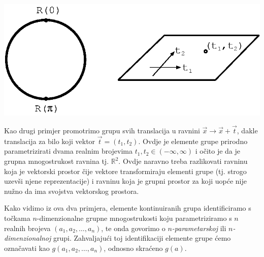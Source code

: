 \centerline{\includegraphics[scale=1.0]{pics/mnogostrukost.eps}}

Kao drugi primjer promotrimo grupu svih translacija u ravnini $\vec{x}\to\vec{x}+\vec{t}$,
dakle translacija za bilo koji vektor $\vec{t}=(t_1, t_2)$.
Ovdje je elemente grupe prirodno parametrizirati dvama
realnim brojevima $t_1, t_2 \in (-\infty, \infty)$ i očito je da je
 grupna mnogostrukost ravnina tj. $\mathbb{R}^2$. Ovdje naravno treba
 razlikovati ravninu koja je vektorski prostor čije vektore transformiraju
 elementi grupe
 (tj. strogo uzevši njene reprezentacije) i ravninu koja je grupni prostor za koji uopće
 nije nužno da ima svojstva vektorskog prostora.

Kako vidimo iz ova dva primjera, elemente kontinuiranih grupa identificiramo
s točkama $n$-dimenzionalne grupne mnogostrukosti koju
parametriziramo s $n$ realnih brojeva
  $(a_1, a_2, \ldots, a_n)$,
te onda govorimo o \emph{$n$-parametarskoj} ili \emph{$n$-dimenzionalnoj} grupi.
Zahvaljajući toj identifikaciji
elemente grupe ćemo označavati kao $g(a_1, a_2, \ldots, a_n)$, odnosno
skraćeno $g(a)$.

